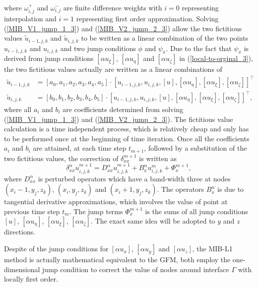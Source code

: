 \documentclass[dissertation]{uathesis}
\begin{document}
\begin{body}
\begin{flushleft}
\begin{align}
\end{align}
%
where $\omega^{+}_{i,j}$ and $\omega^{-}_{i,j}$ are finite difference weights \cite{fornberg1998classroom} with $i=0$ representing interpolation and $i=1$ representing first order approximation. Solving (\ref{MIB_V1_jump_1_3}) and (\ref{MIB_V2_jump_2_3}) allow the two fictitious values $\tilde u_{i-1,j,k}$ and $\tilde u_{i,j,k}$ to be written as a linear combination of the two points $u_{i-1,j,k}$ and $u_{i,j,k}$ and two jump conditions $\phi$ and $\psi_x$. Due to the fact that $\psi_x$ is derived from jump conditions $[\alpha u_\xi]$, $[\alpha u_\eta]$ and $[\alpha u_\zeta]$ in (\ref{local-to-orginal_3}), the two fictitious values actually are written as a linear combinations of 
%
\begin{align}
\label{linear-combination-1_3}
\tilde{u}_{i-1,j,k} &= [a_0, a_1, a_2, a_3, a_4, a_5] \cdot [u_{i-1,j,k}, u_{i,j,k}, [u], [\alpha u_\eta], [\alpha u_\xi], [\alpha u_\zeta]]^{\intercal} \\
\label{linear-combination-2_3} 
\tilde{u}_{i,j,k} &= [b_0, b_1, b_2, b_3, b_4, b_5] \cdot [u_{i-1,j,k}, u_{i,j,k}, [u], [\alpha u_\eta], [\alpha u_\xi], [\alpha u_\zeta]]^{\intercal},
\end{align}
%
where all $a_i$ and $b_i$ are coefficients determined from solving (\ref{MIB_V1_jump_1_3}) and (\ref{MIB_V2_jump_2_3}). The fictitious value calculation is a time independent process, which is relatively cheap and only has to be performed once at the beginning of time iteration. Once all the coefficients $a_i$ and $b_i$ are attained, at each time step $t_{m+1}$, followed by a substitution of the two fictitious values, the correction of $\delta^{m+1}_{xx}$ is written as 
%
\begin{equation} 
\delta^{\alpha}_{xx} u^{m+1}_{i,j,k} = D^{\alpha}_{xx} u^{m+1}_{i,j,k} + B^{\alpha}_{x} u^{m}_{i,j,k} + \Phi_{x}^{m+1}, \label{delta_xx_operator_3}
\end{equation}
%
where $D^{\alpha}_{xx}$ is perturbed operators which have a band-width three at nodes $(x_i-1, y_j, z_k)$, $(x_i, y_j, z_k)$ and $(x_i+1, y_j, z_k)$. The operators $B^{\alpha}_{x}$ is due to tangential derivative approximations, which involves the value of point at previous time step $t_m$. The jump terms $\Phi^{m+1}_{x}$ is the sums of all jump conditions $[u]$, $[\alpha u_\eta]$, $[\alpha u_\xi]$, $[\alpha u_\zeta]$. The exact same idea will be adopted to $y$ and $z$ directions.

\hspace{1cm} Despite of the jump conditions for $[\alpha u_x]$, $[\alpha u_y]$ and $[\alpha u_z]$, the MIB-L1 method is actually mathematical equivalent to the GFM, both employ the one-dimensional jump condition to correct the value of nodes around interface $\Gamma$ with locally first order. 


\end{flushleft}
\end{body}
\end{document}

